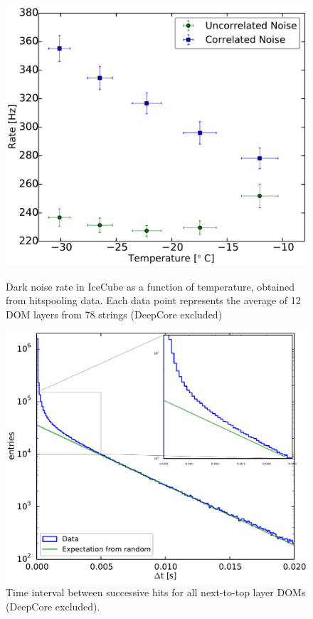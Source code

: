 \begin{figure}
 \begin{minipage}[t]{0.45\linewidth}
 \centering
  \includegraphics[width=\textwidth]{graphics/dom/performance/darknoise/HitRatevsTemp_inice_nomuons_nofit_bigfont.pdf}
 \caption{Dark noise rate in IceCube as a function of temperature, obtained from hitspooling
 data. Each data point represents the average of 12 DOM layers from 78 strings (DeepCore excluded)}
 \label{fig:dom_darknoise_vs_temperature}
 \end{minipage}
\hfill
 \begin{minipage}[t]{0.45\linewidth}
 \centering
  \includegraphics[width=\textwidth]{graphics/dom/performance/darknoise/DarkNoise_Layer2Doms.pdf}
 \caption{Time interval between successive hits for all next-to-top layer DOMs (DeepCore excluded).}
 \label{fig:darknoise_deltaT}
 \end{minipage}
\end{figure}

